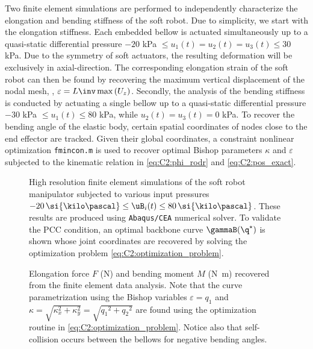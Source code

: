 Two finite element simulations are performed to {independently characterize the elongation and bending stiffness of the soft robot. Due to simplicity, we start with the elongation stiffness}. Each embedded bellow is actuated simultaneously up to a quasi-static differential pressure $-20$ kPa $\le u_1(t) = u_2(t) = u_3(t) \le 30$ kPa. Due to the symmetry of soft actuators, the resulting deformation will be exclusively in axial-direction. The corresponding elongation strain of the soft robot can then be found by recovering the maximum vertical displacement of the nodal mesh, \ie, $\varepsilon = L\inv\max \left( {U}_z \right)$. Secondly, the analysis of the bending stiffness is conducted by actuating a single bellow up to a quasi-static differential pressure $-30$ kPa $\le u_1(t) \le  80$ kPa, while $u_2(t) = u_3(t) = 0$ kPa. To recover the bending angle of the elastic body, certain spatial coordinates of nodes close to the end effector are tracked. Given their global coordinates, a constraint nonlinear optimization \texttt{fmincon.m} is used to recover optimal Bishop parameters $\kappa$ and $\varepsilon
$ subjected to the kinematic relation in \eqref{eq:C2:phi_rodr} and \eqref{eq:C2:pos_exact}.
%
\begin{figure}[!t]
  \centering
   
  \vspace{-0.2cm}
  \caption{\editl High resolution finite element simulations of the soft robot manipulator \editr {} subjected to various input pressures $-20 \,\si{\kilo \pascal} \le \uB_i(t) \le 80 \,\si{\kilo \pascal}$. \editl These results are produced using \texttt{Abaqus/CEA} numerical solver. \editr To validate the PCC condition, an optimal backbone curve $\gammaB(\q^\star)$ is shown  whose joint coordinates are recovered by solving the optimization problem \eqref{eq:C2:optimization_problem}.}
  \vspace{-0.1cm}
  \label{fig:C2:fem_analysis}
\end{figure}
%
\begin{figure}[!t]
 \vspace{-1mm}
  \hspace{-2mm}
  
  \vspace{-0.5cm}
  \caption{Elongation force $F$ (\si{\newton}) and bending moment $M$ (\si{\newton \meter}) recovered from the finite element data analysis. Note that the curve parametrization using the Bishop variables $ \varepsilon = q_1$ and $\kappa = \sqrt{ \kappa_x^2 +  \kappa_y^2} = \sqrt{ {q_1}^2 +  {q_2}^2}$ are found using the optimization routine in \eqref{eq:C2:optimization_problem}. Notice also that self-collision occurs between the bellows for negative bending angles.}
  \vspace{-0.1cm}
  \label{fig:C2:fem_stress}
\end{figure}

